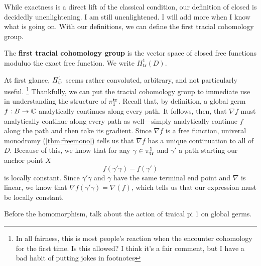 While exactness is a direct lift of the classical condition, our definition of
closed is decidedly unenlightening. {\color{red} I am still unenlightened. I
  will add more when I know what is going on.} With our definitions, we can
define the first tracial cohomology group.

\begin{definition}%
\label{def:firsttrcohomo}
  The \textbf{first tracial cohomology group} is the vector space of closed free
  functions moduluo the exact free function. We write \(H^1_{\textrm{tr}}(D) \).
\end{definition}

At first glance, \(H^1_{\operatorname{tr}}\) seems rather convoluted, arbitrary, and not
particularly useful.
\footnote{In all fairness, this is most people's reaction when the encounter
  cohomology for the first time. {\color{red} Is this allowed? I think it's a
    fair comment, but I have a bad habit of putting jokes in footnotes}}
Thankfully, we can put the tracial cohomology group to immediate use in
understanding the structure of \(\pi_1^{\operatorname{tr}}\). Recall that, by definition, a
global germ \(f:B\to \mathbb{C} \) analytically continues along every path. It follows,
then, that \(\nabla f\) must analytically continue along every path as
well---simply analytically continue \(f\) along the path and then take its
gradient. Since \(\nabla f \) is a free function, univeral monodromy
(\cref{thm:freemono}) tells us that \(\nabla f\) has a unique continuation to
all of \(D\). Because of this, we know that for any \(\gamma \in \pi_{\operatorname{tr}}^1\)
and \(\gamma'\) a path starting our anchor point \(X\)
\[
  f(\gamma'\gamma)-f(\gamma')
\]
is locally constant. Since \(\gamma'\gamma\) and \(\gamma\) have the same
terminal end point and \(\nabla\) is linear, we know that
\(\nabla f(\gamma'\gamma)=\nabla(f)\), which tells us that our expression must
be locally constant.

{\color{blue} Before the homomorphism, talk about the action of traical pi 1 on
  global germs.}

